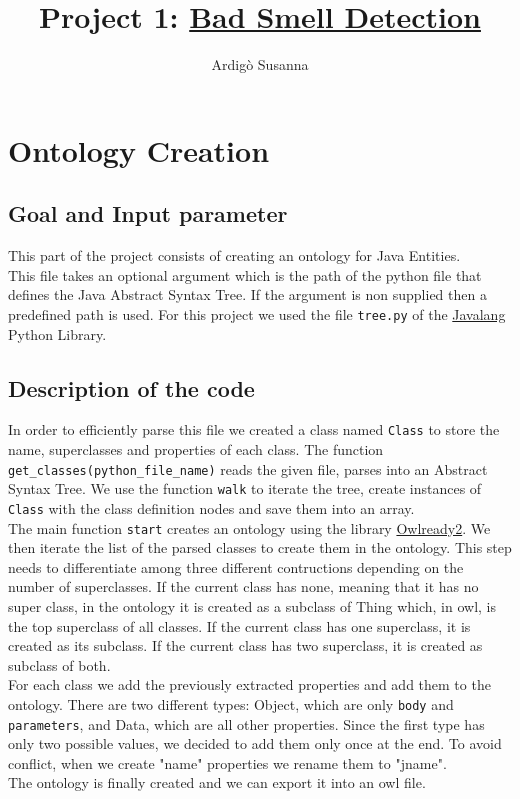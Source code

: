 \documentclass [14 pt]{article}
\title{Project 1: \href{https://github.com/SusyPinkBash/bad_smell_detection}{Bad Smell Detection}}
\author{Ardig\`o Susanna}
\begin{document}
\pagestyle{fancy}
\fancyhf{}
\cfoot{\thepage}

\begin{titlingpage}
\maketitle
\end{titlingpage}

\newpage\thispagestyle{plain}
\tableofcontents
\newpage

\section{Ontology Creation} %
\subsection{Goal and Input parameter}
This part of the project consists of creating an ontology for Java Entities.\\
This file takes an optional argument which is the path of the python file that defines the Java Abstract Syntax Tree. If the argument is non supplied then a predefined path is used. For this project we used the file \texttt{tree.py} of the \href{https://github.com/c2nes/javalang}{Javalang} Python Library. 

\subsection{Description of the code}
In order to efficiently parse this file we created a class named \texttt{Class} to store the name, superclasses and properties of each class.
The function \texttt{get\_classes(python\_file\_name)} reads the given file, parses into an Abstract Syntax Tree. We use the function \texttt{walk} to iterate the tree, create instances of \texttt{Class} with the class definition nodes and save them into an array.\\
The main function \texttt{start} creates an ontology using the library \href{https://pythonhosted.org/Owlready2/}{Owlready2}. We then iterate the list of the parsed classes to create them in the ontology. This step needs to differentiate among three different contructions depending on the number of superclasses.
If the current class has none, meaning that it has no super class, in the ontology it is created as a subclass of Thing which, in owl, is the top superclass of all classes.
If the current class has one superclass, it is created as its subclass.
If the current class has two superclass, it is created as subclass of both.\\
For each class we add the previously extracted properties and add them to the ontology. There are two different types: 
Object, which are only \texttt{body} and \texttt{parameters}, and Data, which are all other properties.
Since the first type has only two possible values, we decided to add them only once at the end. To avoid conflict, when we create "name" properties we rename them to "jname".\\
The ontology is finally created and we can export it into an owl file.
\end{document}
